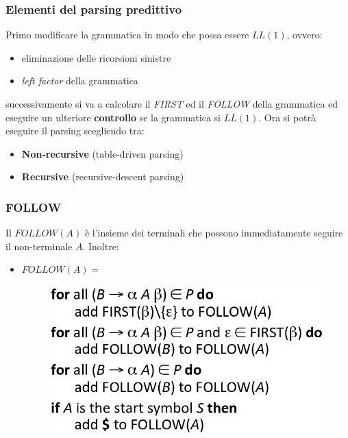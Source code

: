 \subsubsection{Elementi del parsing predittivo}
Primo modificare la grammatica in modo che possa essere $LL(1)$, ovvero:
\begin{itemize}
\item eliminazione delle ricorsioni sinistre
\item \textit{left factor} della grammatica
\end{itemize}

successivamente si va a calcolare il \textit{FIRST} ed il \textit{FOLLOW} della
grammatica ed eseguire un ulteriore \textbf{controllo} se la grammatica si
$LL(1)$. Ora si potr\`a eseguire il parsing scegliendo tra:
\begin{itemize}
\item \textbf{Non-recursive} (table-driven parsing)
\item \textbf{Recursive} (recursive-descent parsing)
\end{itemize}

\subsubsection{FOLLOW}
\begin{definition}[Follow]
Il $FOLLOW(A)$ \`e l'insieme dei terminali che possono immediatamente seguire
il non-terminale $A$. Inoltre:
\begin{itemize}
\item $FOLLOW(A) =$
\begin{figure}[H]
\begin{center}
\includegraphics[scale=0.5]{res/image/follow}
\label{img:follow}
\end{center}
\end{figure}
\end{itemize}
\end{definition}

